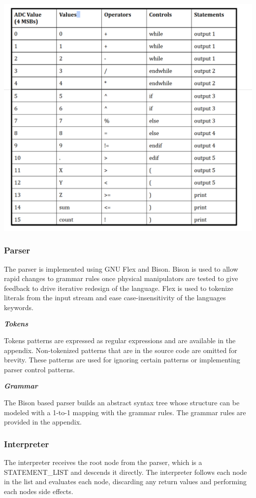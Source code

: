 \documentclass[12pt,a4paper]{article}
\begin{document}
    
     \includegraphics[width=6.5in]{lxer.png}
     \newpage
   \subsubsection{Parser}
   The parser is implemented using GNU Flex and Bison. Bison is used to allow rapid changes to grammar rules once physical manipulators are tested to give feedback to drive iterative redesign of the language. Flex is used to tokenize literals from the input stream and ease case-insensitivity of the language\textquotesingle s keywords.
   
 
   \textit{\textbf{Tokens}}
   
   Tokens patterns are expressed as regular expressions and are available in the appendix. Non-tokenized patterns that are in the source code are omitted for brevity. These patterns are used for ignoring certain patterns or implementing parser control patterns.
     
      \textit{\textbf{Grammar}}
      
      The Bison based parser builds an abstract syntax tree whose structure can be modeled with a 1-to-1 mapping with the grammar rules. The grammar rules are provided in the appendix.
      \subsubsection{Interpreter}
      The interpreter receives the root node from the parser, which is a STATEMENT\_LIST and descends it directly. The interpreter follows each node in the list and evaluates each node, discarding any return values and performing each node\textquotesingle s side effects.
      
\end{document}
